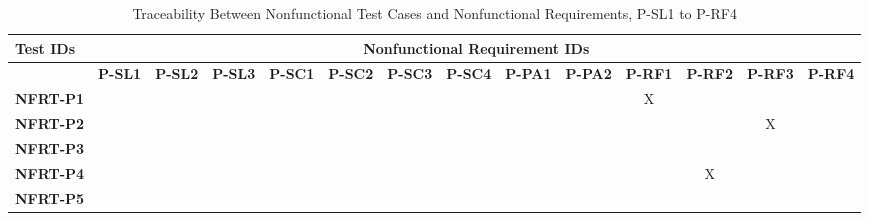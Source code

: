\documentclass[12pt, titlepage]{article}
\begin{document}
\begin{landscape}
	\newpage
	
		\begin{longtable}{|l|ccccccccccccc|}
	\caption{Traceability Between Nonfunctional Test Cases and Nonfunctional Requirements, P-SL1 to P-RF4}                                                                                                                                                                                                                           \\
		\hline
		\textbf{Test IDs}   & \multicolumn{13}{c|}{\textbf{Nonfunctional Requirement IDs}}                                                                                                                                                                                                                 \\
		\hline
		~                   & \textbf{P-SL1}  & \textbf{P-SL2} & \textbf{P-SL3} & \textbf{P-SC1} & \textbf{P-SC2} & \textbf{P-SC3} & \textbf{P-SC4} & \textbf{P-PA1} & \textbf{P-PA2} & \textbf{P-RF1} & \textbf{P-RF2} & \textbf{P-RF3} & \textbf{P-RF4} \\
		\hline
		\textbf{NFRT-P1} & ~                                                         & ~             & ~             & ~             & ~             & ~             & ~             & ~             & ~             & X             & ~             & ~             & ~\\
		\textbf{NFRT-P2} & ~                                                         & ~             & ~             & ~             & ~             & ~             & ~             & ~             & ~             & ~             & ~             & X             & ~ \\
		\textbf{NFRT-P3} & ~                                                         & ~             & ~             & ~             & ~             & ~             & ~             & ~             & ~             & ~             & ~ & ~ & ~ \\
		\textbf{NFRT-P4} & ~                                                         & ~             & ~             & ~             & ~             & ~             & ~             & ~             & ~             & ~             & X & ~ & ~\\
		\textbf{NFRT-P5} & ~                                                         & ~             & ~             & ~             & ~             & ~             & ~             & ~             & ~             & ~             & ~             & ~             & ~ \\

\end{longtable}
\end{landscape}
\end{document}
